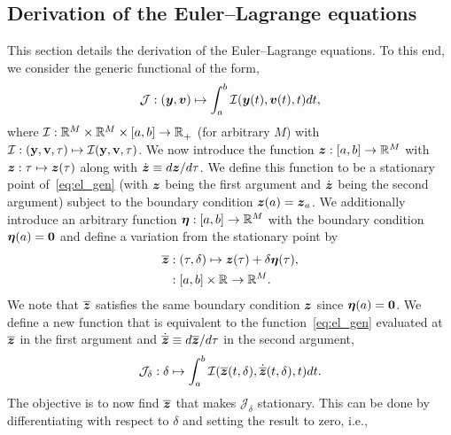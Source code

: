 \documentclass[3p,computermodern,10pt]{elsarticle}
\begin{document}
\begin{appendices}
\section{Derivation of the Euler--Lagrange equations}\label{appendix:eulerlagrange}
This section details the derivation of the Euler--Lagrange equations. To this end, we consider the generic functional of the form,
\begin{equation}\label{eq:el_gen}
\mathcal{J}: (\boldsymbol y,{\boldsymbol v}) \mapsto  \int_a^b \mathcal{I}(\boldsymbol y(t),{\boldsymbol v}(t),t)  dt,
\end{equation}
where $\mathcal{I}: \mathbb{R}^{M}  \times \mathbb{R}^{M}  \times[a,b] \rightarrow  \mathbb{R}^{}_{+}$
	(for arbitrary $M$) with $\mathcal{I}:
	(\mathbf{y},\mathbf{{v}},\tau) \mapsto
	\mathcal{I}(\mathbf{y},\mathbf{{v}},\tau)$. We now introduce
	the function $\boldsymbol z: [a,b] \rightarrow \mathbb{R}^{M}$ with $\boldsymbol z: \tau \mapsto \boldsymbol z(\tau)$ along with $\dot{\boldsymbol z} \equiv d \boldsymbol z /d\tau$. We define this function to be a stationary point of~\eqref{eq:el_gen} (with $\boldsymbol z$ being the first argument and $\dot{\boldsymbol z}$ being the second argument) subject to the boundary condition
	$\boldsymbol z(a) = \boldsymbol z_a$. 
We additionally introduce an arbitrary function $\boldsymbol \eta : [a,b] \rightarrow \mathbb{R}^{M}$
with the boundary condition $\boldsymbol \eta(a) = \boldsymbol 0$ and define a variation
from the stationary point by
\begin{align*}
\overline{\boldsymbol z}  &: (\tau,\delta) \mapsto \boldsymbol z(\tau) + \delta \boldsymbol \eta(\tau),\\
&: [a,b] \times \mathbb{R}^{} \rightarrow \mathbb{R}^{M}.
\end{align*}
We note that $\overline{\boldsymbol z}$ satisfies the same boundary condition $\boldsymbol z$ since $\boldsymbol \eta(a) = \boldsymbol 0$.
We define a new function that is equivalent to the function~\eqref{eq:el_gen} evaluated at $\overline{\boldsymbol z}$ in the first argument and 
$\dot{\overline{\boldsymbol z}} \equiv d\overline{\boldsymbol z} / d\tau$ in the second argument,
$$
\mathcal{J}_{\delta}: \delta \mapsto \int_a^b \mathcal{I}(\overline{\boldsymbol z}(t,\delta),\dot{\overline{\boldsymbol z}}(t,\delta) ,t)  dt.
$$
The objective is to now find $\overline{\boldsymbol z}$ that makes
$\mathcal{J}_{\delta}$ stationary. This can be done by differentiating with
respect to $\delta$ and setting the result to zero, i.e., %
\begin{equation}\label{eq:stationaryOne}

\end{equation}
\end{appendices}
\end{document}
